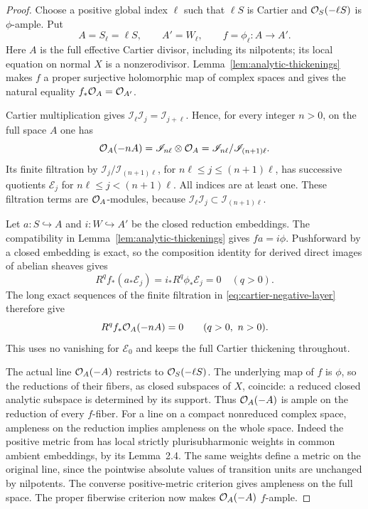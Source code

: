\begin{proof}
Choose a positive global index \(\ell\) such that \(\ell S\) is
Cartier and \(\mathcal O_S(-\ell S)\) is \(\phi\)-ample.  Put
\[
 A=S_\ell=\ell S,\qquad A'=W_\ell,
 \qquad f=\phi_\ell:A\longrightarrow A'.
\]
Here \(A\) is the full effective Cartier divisor, including its
nilpotents; its local equation on normal \(X\) is a nonzerodivisor.
Lemma~\ref{lem:analytic-thickenings} makes \(f\) a proper surjective
holomorphic map of complex spaces and gives the natural equality
\(f_*\mathcal O_A=\mathcal O_{A'}\).

Cartier multiplication gives
\(\mathscr I_\ell\mathscr I_j=\mathscr I_{j+\ell}\).  Hence, for
every integer \(n>0\), on the full space \(A\) one has
\begin{equation}\label{eq:cartier-negative-layer}
 \mathcal O_A(-nA)
 =\mathscr I_{n\ell}\otimes\mathcal O_A
 =\mathscr I_{n\ell}/\mathscr I_{(n+1)\ell}.
\end{equation}
Its finite filtration by
\(\mathscr I_j/\mathscr I_{(n+1)\ell}\), for
\(n\ell\leq j\leq(n+1)\ell\), has successive quotients
\(\mathscr E_j\) for \(n\ell\leq j<(n+1)\ell\).  All indices are
at least one.  These filtration terms are \(\mathcal O_A\)-modules, because
\(\mathscr I_\ell\mathscr I_j\subset\mathscr I_{(n+1)\ell}\).

Let \(a:S\hookrightarrow A\) and \(i:W\hookrightarrow A'\) be the
closed reduction embeddings.  The compatibility in
Lemma~\ref{lem:analytic-thickenings} gives \(fa=i\phi\).
Pushforward by a closed embedding is exact, so the composition identity
for derived direct images of abelian sheaves gives
\[
 R^q f_*(a_*\mathscr E_j)=i_*R^q\phi_*\mathscr E_j=0\quad(q>0).
\]
The long exact sequences of the finite filtration in
\eqref{eq:cartier-negative-layer} therefore give
\begin{equation}\label{eq:cartier-negative-vanishing}
 R^q f_*\mathcal O_A(-nA)=0\qquad(q>0,\ n>0).
\end{equation}
This uses no vanishing for \(\mathscr E_0\) and keeps the full Cartier
thickening throughout.

The actual line \(\mathcal O_A(-A)\) restricts to
\(\mathcal O_S(-\ell S)\).  The underlying map of \(f\) is \(\phi\),
so the reductions of their fibers, as closed subspaces of \(X\),
coincide: a reduced closed analytic subspace is determined by its support.
Thus \(\mathcal O_A(-A)\) is ample on the reduction of every \(f\)-fiber.
For a line on a compact nonreduced complex space, ampleness on the
reduction implies ampleness on the whole space.  Indeed the positive
metric from \cite[Corollary~1.12]{Fujino2026Fujiki} has local strictly
plurisubharmonic weights in common ambient embeddings, by its Lemma~2.4.
The same weights define a metric on the original line, since the
pointwise absolute values of transition units are unchanged by
nilpotents.  The converse positive-metric criterion gives ampleness on
the full space.  The proper fiberwise criterion
\cite[Definition~3.1 and Remark~3.2]{Fujino2026Fujiki} now makes
\(\mathcal O_A(-A)\) \(f\)-ample.


\end{proof}
